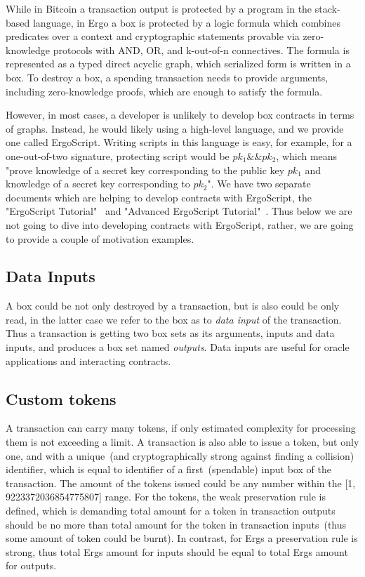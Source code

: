  While in Bitcoin a transaction output is protected by a program in the stack-based language, in Ergo a
 box is protected by a logic formula which combines predicates over a context and cryptographic statements provable
 via zero-knowledge protocols with AND, OR, and k-out-of-n connectives. The formula is represented as a typed direct
 acyclic graph, which serialized form is written in a box. To destroy a box, a spending transaction needs to provide
 arguments, including zero-knowledge proofs, which are enough to satisfy the formula.

 However, in most cases, a developer is unlikely to develop box contracts in terms of graphs. Instead, he would likely
 using a high-level language, and we provide one called ErgoScript. Writing scripts in this language is easy, for
 example, for a one-out-of-two signature, protecting script would be ${pk_1 \&\& pk_2}$, which means "prove knowledge of
 a secret key corresponding to the public key $pk_1$ and knowledge of a secret key corresponding to $pk_2$". We have
 two separate documents which are helping to develop contracts with ErgoScript, the "ErgoScript Tutorial"~\cite{ergoTutorial}
 and "Advanced ErgoScript Tutorial"~\cite{ergoAdvTutorial}. Thus below we are not going to dive into developing contracts with
 ErgoScript, rather, we are going to provide a couple of motivation examples.

\subsection{Data Inputs}
 \label{sec:data-inputs}

 A box could be not only destroyed by a transaction, but is also could be only read, in the latter case we refer to the
 box as to {\em data input} of the transaction. Thus a transaction is getting two box sets as its arguments, inputs and
 data inputs, and produces a box set named {\em outputs}. Data inputs are useful for oracle applications and interacting
 contracts.

\subsection{Custom tokens}
 \label{sec:custom tokens}

 A transaction can carry many tokens, if only estimated complexity for processing them is not exceeding a limit. A
 transaction is also able to issue a token, but only one, and with a unique~(and cryptographically strong against
 finding a collision) identifier, which is equal to identifier of a first~(spendable) input box of the transaction.
 The amount of the tokens issued could be any number within the [1, 9223372036854775807] range. For the tokens, the weak
 preservation rule is defined, which is demanding total amount for a token in transaction outputs should be no more
 than total amount for the token in transaction inputs~(thus some amount of token could be burnt). In contrast, for Ergs
 a preservation rule is strong, thus total Ergs amount for inputs should be equal to total Ergs amount for outputs.

